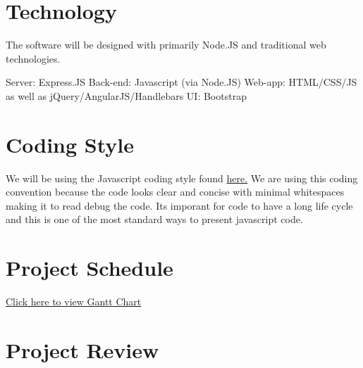\documentclass{article}
\begin{document}
\section{Technology}
The software will be designed with primarily Node.JS and traditional web technologies.

Server: Express.JS
Back-end: Javascript (via Node.JS)
Web-app: HTML/CSS/JS as well as jQuery/AngularJS/Handlebars
UI: Bootstrap

\section{Coding Style}
We will be using the Javascript coding style found \href{http://javascript.crockford.com/code.html}{here.}
We are using this coding convention because the code looks clear and concise with minimal whitespaces making it to read debug the code. Its imporant for code to have a long life cycle and this is one of the most standard ways to present javascript code.

\section{Project Schedule}
\href{run:GanttChart.gan}{Click here to view Gantt Chart}

\section{Project Review}
\end{document}
